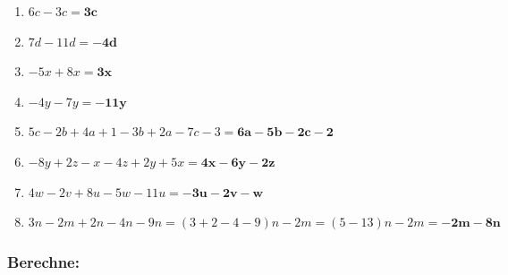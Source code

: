 \documentclass[a4paper,12pt]{article} %
\begin{document}
\begin{enumerate}[label=\alph*)]

  \item \(6c - 3c = \mathbf{3c}\) %

  \item \(7d - 11d = \mathbf{-4d}\) %

  \item \(-5x + 8x = \mathbf{3x}\) %

  \item \(-4y - 7y = \mathbf{-11y}\) %

  \item \(5c - 2b + 4a + 1 - 3b + 2a - 7c - 3 = \mathbf{6a - 5b - 2c -2}\) %

  \item \(-8y + 2z - x - 4z + 2y + 5x = \mathbf{4x - 6y - 2z}\) %

  \item \(4w - 2v + 8u - 5w - 11u = \mathbf{-3u - 2v - w}\) %

  \item \(3n - 2m + 2n - 4n - 9n = (3 + 2 - 4 - 9)n - 2m = (5 - 13)n - 2m = \mathbf{-2m - 8n}\) %

\end{enumerate}

\subsubsection{Berechne:} %
\end{document}
